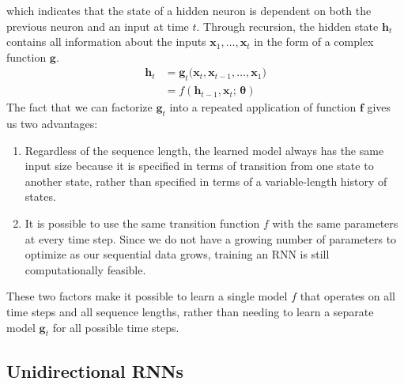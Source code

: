 \documentclass{article}
\theoremstyle{definition}
\theoremstyle{remark}
\theoremstyle{definition}
\begin{document}
which indicates that the state of a hidden neuron is dependent on both the previous neuron and an input at time $t$. Through recursion, the hidden state $\mathbf{h}_t$ contains all information about the inputs $\mathbf{x}_1, \ldots, \mathbf{x}_t$ in the form of a complex function $\mathbf{g}$. 
\begin{align*}
    \mathbf{h}_t & = \mathbf{g}_t \big( \mathbf{x}_t, \mathbf{x}_{t - 1}, \ldots, \mathbf{x}_1 \big) \\
    & = f(\mathbf{h}_{t - 1}, \mathbf{x}_t; \, \boldsymbol{\theta}) 
\end{align*}
The fact that we can factorize $\mathbf{g}_t$ into a repeated application of function $\mathbf{f}$ gives us two advantages: 
\begin{enumerate}
    \item Regardless of the sequence length, the learned model always has the same input size because it is specified in terms of transition from one state to another state, rather than specified in terms of a variable-length history of states. 

    \item It is possible to use the same transition function $f$ with the same parameters at every time step. Since we do not have a growing number of parameters to optimize as our sequential data grows, training an RNN is still computationally feasible. 
\end{enumerate}
These two factors make it possible to learn a single model $f$ that operates on all time steps and all sequence lengths, rather than needing to learn a separate model $\mathbf{g}_t$ for all possible time steps. 



\subsection{Unidirectional RNNs}
\end{document}
